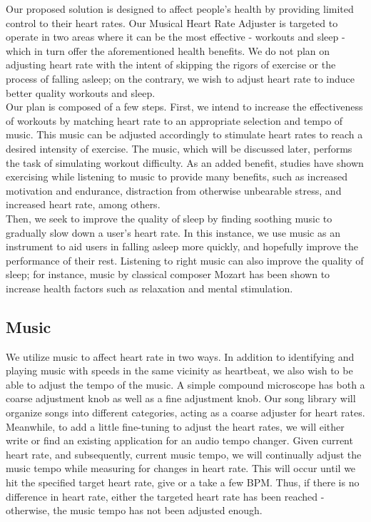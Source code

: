 \documentclass[letterpaper,english, 12pt]{scrreprt}
\begin{document}
Our proposed solution is designed to affect people's health by providing limited control to their heart rates. Our Musical Heart Rate Adjuster is targeted to operate in two areas where it can be the most effective - workouts and sleep - which in turn offer the aforementioned health benefits. We do not plan on adjusting heart rate with the intent of skipping the rigors of exercise or the process of falling asleep; on the contrary, we wish to adjust heart rate to induce better quality workouts and sleep.\\
			 
Our plan is composed of a few steps. First, we intend to increase the effectiveness of workouts by matching heart rate to an appropriate selection and tempo of music. This music can be adjusted accordingly to stimulate heart rates to reach a desired intensity of exercise. The music, which will be discussed later, performs the task of simulating workout difficulty. As an added benefit, studies have shown exercising while listening to music to provide many benefits, such as increased motivation and endurance, distraction from otherwise unbearable stress, and increased heart rate, among others.\\
			 
Then, we seek to improve the quality of sleep by finding soothing music to gradually slow down a user's heart rate. In this instance, we use music as an instrument to aid users in falling asleep more quickly, and hopefully improve the performance of their rest. Listening to right music can also improve the quality of sleep; for instance, music by classical composer Mozart has been shown to increase health factors such as relaxation and mental stimulation.\\
			 
\subsection{Music}
We utilize music to affect heart rate in two ways. In addition to identifying and playing music with speeds in the same vicinity as heartbeat, we also wish to be able to adjust the tempo of the music. A simple compound microscope has both a coarse adjustment knob as well as a fine adjustment knob. Our song library will organize songs into different categories, acting as a coarse adjuster for heart rates. Meanwhile, to add a little fine-tuning to adjust the heart rates, we will either write or find an existing application for an audio tempo changer. Given current heart rate, and subsequently, current music tempo, we will continually adjust the music tempo while measuring for changes in heart rate. This will occur until we hit the specified target heart rate, give or a take a few BPM. Thus, if there is no difference in heart rate, either the targeted heart rate has been reached - otherwise,  the music tempo has not been adjusted enough.\\
			 
\end{document}
